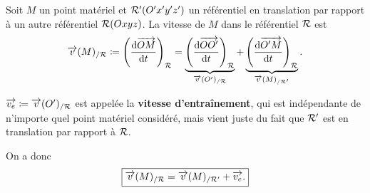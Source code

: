             Soit $M$ un point matériel et $\mathcal{R}'(O'x'y'z')$ un référentiel en translation par rapport à un autre référentiel $\mathcal{R}(Oxyz)$. La vitesse de $M$ dans le référentiel $\mathcal{R}$ est
            \begin{equation*}
                \protect\overrightarrow{{v}}(M)_{/\mathcal{R}}\coloneqq\left(\frac{\mathrm{d}\protect\overrightarrow{{OM}}}{\mathrm{d} t}\right)_{\mathcal{R}}=\underbrace{\left(\frac{\mathrm{d} \protect\overrightarrow{{OO'}}}{\mathrm{d} t}\right)_{\mathcal{R}}}_{\protect\overrightarrow{{v}}(O')_{/\mathcal{R}}}+\underbrace{\left(\frac{\mathrm{d}\protect\overrightarrow{{O'M}}}{\mathrm{d} t}\right)_{\mathcal{R}}}_{\protect\overrightarrow{{v}}(M)_{/\mathcal{R}'}}.
            \end{equation*}
            \begin{definition}
                $\protect\overrightarrow{{v_e}}\coloneqq\protect\overrightarrow{{v}}(O')_{/\mathcal{R}}$ est appelée la \textbf{vitesse d'entraînement}, qui est indépendante de n'importe quel point matériel considéré, mais vient juste du fait que $\mathcal{R}'$ est en translation par rapport à $\mathcal{R}$.
            \end{definition}
            On a donc
            \begin{equation*}
                \boxed{
                    \protect\overrightarrow{{v}}(M)_{/\mathcal{R}}=\protect\overrightarrow{{v}}(M)_{/\mathcal{R}'}+\protect\overrightarrow{{v_e}}.
                }
            \end{equation*}

